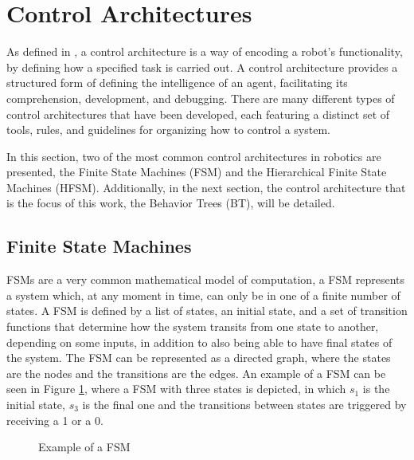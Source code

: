 \section{Control Architectures}

As defined in \cite{BTsInRobotics2}, a control architecture is a way of encoding a robot's functionality, by defining how a specified task is carried out. A control architecture provides a structured form of defining the intelligence of an agent, facilitating its comprehension, development, and debugging. There are many different types of control architectures that have been developed, each featuring a distinct set of tools, rules, and guidelines for organizing how to control a system.

In this section, two of the most common control architectures in robotics are presented, the Finite State Machines (FSM) and the Hierarchical Finite State Machines (HFSM). Additionally, in the next section, the control architecture that is the focus of this work, the Behavior Trees (BT), will be detailed.

\subsection{Finite State Machines}

FSMs are a very common mathematical model of computation, a FSM represents a system which, at any moment in time, can only be in one of a finite number of states. A FSM is defined by a list of states, an initial state, and a set of transition functions that determine how the system transits from one state to another, depending on some inputs, in addition to also being able to have final states of the system. The FSM can be represented as a directed graph, where the states are the nodes and the transitions are the edges. An example of a FSM can be seen in Figure \ref{fig:fsm_example}, where a FSM with three states is depicted, in which $s_1$ is the initial state, $s_3$ is the final one and the transitions between states are triggered by receiving a 1 or a 0.

\begin{figure}[!h]
    \centering
    \caption{Example of a FSM}
    \label{fig:fsm_example}
\end{figure}

